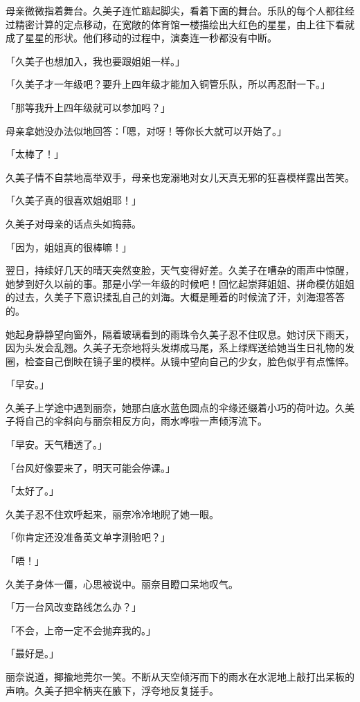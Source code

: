 \documentclass[UTF8]{ctexart}
\begin{document}
    母亲微微指着舞台。久美子连忙踮起脚尖，看着下面的舞台。乐队的每个人都往经过精密计算的定点移动，在宽敞的体育馆一楼描绘出大红色的星星，由上往下看就成了星星的形状。他们移动的过程中，演奏连一秒都没有中断。 

    「久美子也想加入，我也要跟姐姐一样。」 

    「久美子才一年级吧？要升上四年级才能加入铜管乐队，所以再忍耐一下。」 

    「那等我升上四年级就可以参加吗？」 

    母亲拿她没办法似地回答：「嗯，对呀！等你长大就可以开始了。」 

    「太棒了！」 

    久美子情不自禁地高举双手，母亲也宠溺地对女儿天真无邪的狂喜模样露出苦笑。 

    「久美子真的很喜欢姐姐耶！」 

    久美子对母亲的话点头如捣蒜。 

    「因为，姐姐真的很棒嘛！」 

    翌日，持续好几天的晴天突然变脸，天气变得好差。久美子在嘈杂的雨声中惊醒，她梦到好久以前的事。那是小学一年级的时候吧！回忆起崇拜姐姐、拼命模仿姐姐的过去，久美子下意识揉乱自己的刘海。大概是睡着的时候流了汗，刘海湿答答的。 

    她起身静静望向窗外，隔着玻璃看到的雨珠令久美子忍不住叹息。她讨厌下雨天，因为头发会乱翘。久美子无奈地将头发绑成马尾，系上绿辉送给她当生日礼物的发圈，检查自己倒映在镜子里的模样。从镜中望向自己的少女，脸色似乎有点憔悴。 

    「早安。」 

    久美子上学途中遇到丽奈，她那白底水蓝色圆点的伞缘还缀着小巧的荷叶边。久美子将自己的伞斜向与丽奈相反方向，雨水哗啦一声倾泻流下。 

    「早安。天气糟透了。」 

    「台风好像要来了，明天可能会停课。」 

    「太好了。」 

    久美子忍不住欢呼起来，丽奈冷冷地睨了她一眼。 

    「你肯定还没准备英文单字测验吧？」 

    「唔！」 

    久美子身体一僵，心思被说中。丽奈目瞪口呆地叹气。 

    「万一台风改变路线怎么办？」 

    「不会，上帝一定不会抛弃我的。」 

    「最好是。」 

    丽奈说道，揶揄地莞尔一笑。不断从天空倾泻而下的雨水在水泥地上敲打出呆板的声响。久美子把伞柄夹在腋下，浮夸地反复搓手。 
\end{document}
